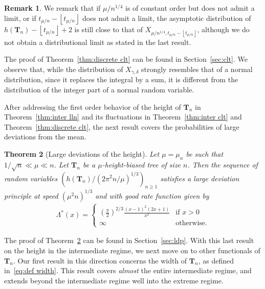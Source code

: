 \documentclass{article}
\newcommand{\1}{\mathbbm{1}}								%
\newtheorem{theorem}{Theorem}[section]
\theoremstyle{definition}
\newtheorem{remark}[theorem]{Remark}
\numberwithin{equation}{section}
\newcommand{\bT}{\mathbf T}
\newcommand{\floor}[1]{\left\lfloor #1\right\rfloor}
\begin{document}
\begin{remark}
    We remark that if $\mu/n^{1/4}$ is of constant order but does not admit a limit, or if $t_{\mu/n}-\floor{t_{\mu/n}}$ does not admit a limit, the asymptotic distribution of $h(\mathbf{T}_n)-\floor{t_{\mu/n}}+2$ is still close to that of $X_{\mu/n^{1/4},t_{\mu/n}-\floor{t_{\mu/n}}}$, although we do not obtain a distributional limit as stated in the last result.
\end{remark}



The proof of Theorem~\ref{thm:discrete clt} can be found in Section~\ref{sec:clt}.
We observe that, while the distribution of $X_{\gamma,\delta}$ strongly resembles that of a normal distribution, since it replaces the integral by a sum, it is different from the distribution of the integer part of a normal random variable.

 After addressing the first order behavior of the height of $\mathbf{T}_n$ in Theorem~\ref{thm:inter lln} and its fluctuations in Theorem~\ref{thm:inter clt} and Theorem~\ref{thm:discrete clt}, the next result covers the probabilities of large deviations from the mean.
\begin{theorem}[Large deviations of the height]\label{thm:ldp}
    Let $\mu=\mu_n$ be such that $1/\sqrt{n}\ll\mu\ll n$.
    Let $\mathbf{T}_n$ be a $\mu$-height-biased tree of size $n$.
    Then the sequence of random variables $(h(\bT_n)/(2\pi^2n/\mu)^{1/3})_{n \geq 1}$ satisfies a large deviation principle at speed $(\mu^2 n)^{1/3}$ and with good rate function given by
    \begin{align*}
        \Lambda^*(x)=\left\{\begin{array}{ll}
            \left(\frac{\pi}{2}\right)^{2/3}\frac{(x-1)^2(2x+1)}{x^2} & \textrm{if $x>0$} \\
            \infty & \textrm{otherwise.}
        \end{array}\right.
    \end{align*}
\end{theorem}

The proof of Theorem~\ref{thm:ldp} can be found in Section~\ref{sec:ldp}.
With this last result on the height in the intermediate regime, we next move on to other functionals of $\mathbf{T}_n$. Our first result in this direction concerns the width of $\mathbf{T}_n$, as defined in~\eqref{eq:def width}. This result covers \emph{almost} the entire intermediate regime, and extends beyond the intermediate regime well into the extreme regime.
\end{document}
